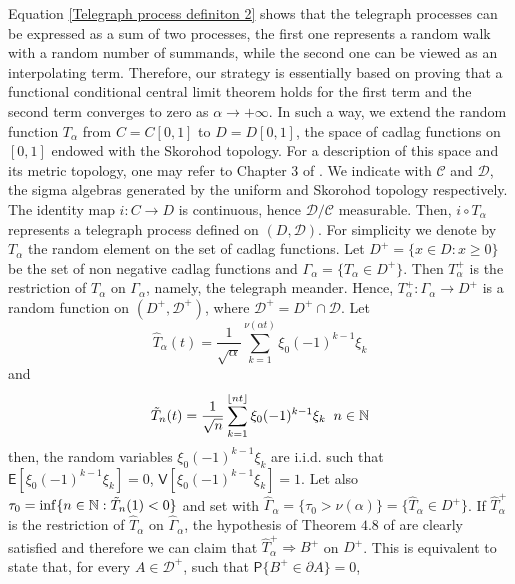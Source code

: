 \documentclass{article}
\theoremstyle{definition}
\numberwithin{equation}{section}
\begin{document}
Equation \eqref{Telegraph process definiton 2} shows that the telegraph processes can be expressed as a sum of two processes, the first one represents a random walk with a random number of summands, while the second one can be viewed as an interpolating term. Therefore, our strategy is essentially based on proving that a functional conditional central limit theorem holds for the first term and the second term converges to zero as $\alpha \to +\infty$. In such a way, we extend the random function $T_\alpha$ from $C = C[0,1]$ to $D = D[0,1]$, the space of cadlag functions on $[0,1]$ endowed with the Skorohod topology. For a description of this space and its metric topology, one may refer to Chapter 3 of \cite{Billingsley}. We indicate with $\mathcal{C}$ and $\mathcal{D}$, the sigma algebras generated by the uniform and Skorohod topology respectively. The identity map $i:C\to D$ is continuous, hence $\mathcal{D}/\mathcal{C}$ measurable. Then, $i\circ T_{\alpha}$ represents a telegraph process defined on $(D,\mathcal{D})$. For simplicity we denote by $T_\alpha$ the random element on the set of cadlag functions. Let $D^+ = \{x\in D: x\geq 0\}$ be the set of non negative cadlag functions and $\Gamma_{\alpha} = \{T_\alpha \in D^+\}$. Then $T^+_\alpha$ is the restriction of $T_\alpha$ on $\Gamma_\alpha$, namely, the telegraph meander. Hence, $T^+_\alpha: \Gamma_\alpha \to D^+$ is a random function on $(D^+,\mathcal{D^+})$, where $\mathcal{D^+} = D^+ \cap \mathcal{D}$. Let 
\begin{equation}
\hat{T}_{\alpha}(t) = \frac{1}{\sqrt{\alpha}}\sum_{k=1}^{\nu(\alpha t)}\xi_0(-1)^{k-1}\xi_k
\end{equation}
and
\begin{equation}
\Tilde{T}_{n}(t) = \frac{1}{\sqrt{n}}\sum_{k=1}^{\lfloor n t\rfloor}\xi_0(-1)^{k-1}\xi_k \;\; n \in \mathbb{N}
\end{equation}
then, the random variables $\xi_0(-1)^{k-1}\xi_k$ are i.i.d. such that $\mathsf{E}[\xi_0(-1)^{k-1}\xi_k] = 0$, $\mathsf{V}[\xi_0(-1)^{k-1}\xi_k] = 1$. Let also $\tau_0 = \inf\{n \in \mathbb{N}: \Tilde{T}_{n}(1) < 0\}$ and set with \mbox{$\hat{\Gamma}_{\alpha} = \{\tau_0 > \nu(\alpha)\} = \{\hat{T}_\alpha \in D^+\}$}. If $\hat{T}^+_{\alpha}$ is the restriction of $\hat{T}_\alpha$ on $\hat{\Gamma}_{\alpha}$, the hypothesis of Theorem $4.8$ of \cite{I 1974} are clearly satisfied and therefore we can claim that $\hat{T}^+_{\alpha} \Rightarrow B^{+}$ on $D^+$. This is equivalent to state that, for every $A \in \mathcal{D}^+$, such that $\mathsf{P}\{B^+ \in \partial A\} = 0$,
\end{document}

